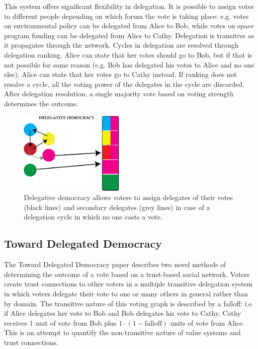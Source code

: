 \documentclass[a4paper]{acm_proc_article-sp}
\begin{document}
This system offers significant flexibility in delegation.  It is possible to assign votes to different people depending on
which forum the vote is taking place: e.g. votes on environmental policy can be delegated from Alice to Bob, while votes on
space program funding can be delegated from Alice to Cathy.  Delegation is transitive as it propagates through the network.
Cycles in delegation are resolved through delegation ranking.  Alice can state that her votes should go to Bob, but if that is
not possible for some reason (e.g. Bob has delegated his votes to Alice and no one else), Alice can state that her votes go to
Cathy instead.  If ranking does not resolve a cycle, all the voting power of the delegates in the cycle are discarded.  After
delegation resolution, a single majority vote based on voting strength determines the outcome.

\begin{figure}
\centering
\includegraphics[width=0.45\textwidth]{figures/delegativedemocracy3.png}
\caption{Delegative democracy allows voters to assign delegates of their votes (black lines) and secondary delegates (grey lines) in case of a delegation cycle in which no one casts a vote.}
\end{figure}

\subsection{Toward Delegated Democracy}

The Toward Delegated Democracy paper \cite{tdd} describes two novel methods of determining the outcome of a vote based on a trust-based
social network.  Voters create trust connections to other voters in a multiple transitive delegation system in which voters
delegate their vote to one or many others in general rather than by domain.  The transitive nature of this voting graph is
described by a falloff: i.e. if Alice delegates her vote to Bob and Bob delegates his vote to Cathy, Cathy receives 1 unit of
vote from Bob plus $1 \cdot (1-\mathrm{falloff})$ units of vote from Alice.  This is an attempt to quantify the non-transitive
nature of value systems and trust connections.
\end{document}

